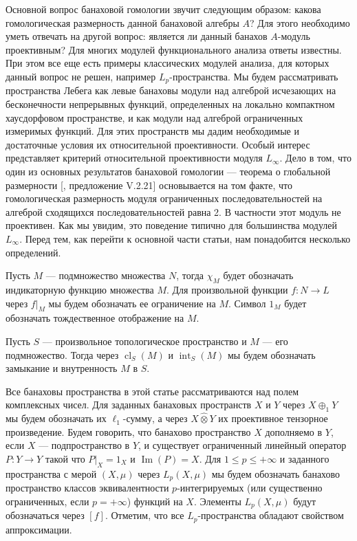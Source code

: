 \documentclass[12pt]{article}
\numberwithin{equation}{subsection}
\theoremstyle{plain}
\newcommand{\projtens}{\mathbin{\widehat{\otimes}}}
\begin{document}
\begin{fulltext}
    Основной вопрос банаховой гомологии звучит следующим образом: какова
    гомологическая размерность данной банаховой алгебры $A$? Для этого
    необходимо уметь отвечать на другой вопрос: является ли данный банахов
    $A$-модуль проективным? Для многих модулей функционального анализа ответы
    известны. При этом все еще есть примеры классических модулей анализа, для
    которых данный вопрос не решен, например $L_p$-пространства. Мы будем
    рассматривать пространства Лебега как левые банаховы модули над алгеброй
    исчезающих на бесконечности непрерывных функций, определенных на локально
    компактном хаусдорфовом пространстве, и как модули над алгеброй ограниченных
    измеримых функций. Для этих пространств мы дадим необходимые и достаточные
    условия их относительной проективности. Особый интерес представляет критерий
    относительной проективности модуля $L_\infty$. Дело в том, что один из
    основных результатов банаховой гомологии --- теорема о глобальной
    размерности [\cite{HelHomolBanTopAlg}, предложение V.2.21] основывается на
    том факте, что гомологическая размерность модуля ограниченных
    последовательностей на алгеброй сходящихся последовательностей равна 2. В
    частности этот модуль не проективен. Как мы увидим, это поведение типично
    для большинства модулей $L_\infty$. Перед тем, как перейти к основной части
    статьи, нам понадобится несколько определений.

    Пусть $M$ --- подмножество множества $N$, тогда $\chi_M$ будет обозначать
    индикаторную функцию множества $M$. Для произвольной функции $f:N\to L$
    через $f|_M$ мы будем обозначать ее ограничение на $M$. Символ $1_M$ будет
    обозначать тождественное отображение на $M$.

    Пусть $S$ --- произвольное топологическое пространство и $M$ --- его
    подмножество. Тогда через $\operatorname{cl}_S(M)$ и
    $\operatorname{int}_S(M)$ мы будем обозначать замыкание и внутренность $M$ в
    $S$.

    Все банаховы пространства в этой статье рассматриваются над полем
    комплексных чисел. Для заданных банаховых пространств $X$ и $Y$ через
    $X\oplus_1 Y$ мы будем обозначать их $\ell_1$-сумму, а через $X\projtens Y$
    их проективное тензорное произведение. Будем говорить, что банахово
    пространство $X$ дополняемо в $Y$, если $X$ --- подпространство в $Y$, и
    существует ограниченный линейный оператор $P:Y\to Y$ такой что $P|_X=1_X$ и
    $\operatorname{Im}(P)=X$. Для $1\leq p\leq +\infty$ и заданного пространства
    с мерой $(X,\mu)$ через $L_p(X,\mu)$ мы будем обозначать банахово
    пространство классов эквивалентности $p$-интегрируемых (или существенно
    ограниченных, если $p=+\infty$) функций на $X$. Элементы $L_p(X,\mu)$ будут
    обозначаться через $[f]$. Отметим, что все $L_p$-пространства обладают
    свойством аппроксимации.


\end{fulltext}
\end{document}
